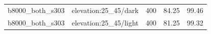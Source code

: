 \begin{longtable}{l>{\raggedright\arraybackslash}p{.42\linewidth}rrr}
b8000\_\allowbreak{}both\_\allowbreak{}s303 & %
elevation:25\_\allowbreak{}45/dark & %
400 & %
84.25 & %
99.46 \\ %

b8000\_\allowbreak{}both\_\allowbreak{}s303 & %
elevation:25\_\allowbreak{}45/light & %
400 & %
81.25 & %
99.32 \\ %


\end{longtable}
